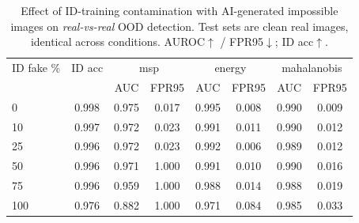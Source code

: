 \begin{table}[t]\centering
\caption{Effect of ID-training contamination with AI-generated impossible images on \emph{real-vs-real} OOD detection. Test sets are clean real images, identical across conditions. AUROC$\uparrow$ / FPR95$\downarrow$; ID acc$\uparrow$.}
\label{tab:contamination}
\begin{tabular}{lccccccc}
\toprule
ID fake \% & ID acc & \multicolumn{2}{c}{msp} & \multicolumn{2}{c}{energy} & \multicolumn{2}{c}{mahalanobis} \\
 &  & AUC & FPR95 & AUC & FPR95 & AUC & FPR95 \\ \midrule
0 & 0.998 & 0.975 & 0.017 & 0.995 & 0.008 & 0.990 & 0.009 \\
10 & 0.997 & 0.972 & 0.023 & 0.991 & 0.011 & 0.990 & 0.012 \\
25 & 0.996 & 0.972 & 0.023 & 0.992 & 0.006 & 0.989 & 0.012 \\
50 & 0.996 & 0.971 & 1.000 & 0.991 & 0.010 & 0.990 & 0.016 \\
75 & 0.996 & 0.959 & 1.000 & 0.988 & 0.014 & 0.988 & 0.019 \\
100 & 0.976 & 0.882 & 1.000 & 0.971 & 0.084 & 0.985 & 0.033 \\
\bottomrule
\end{tabular}
\end{table}